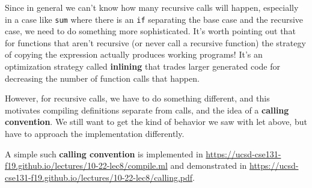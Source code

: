 \documentclass[10pt, oneside]{article}
\begin{document}
Since in general we can't know how many recursive calls will happen,
especially in a case like {\tt sum} where there is an {\tt if} separating the
base case and the recursive case, we need to do something more sophisticated.
It's worth pointing out that for functions that aren't recursive (or never
call a recursive function) the strategy of copying the expression actually
produces working programs! It's an optimization strategy called {\bf
inlining} that trades larger generated code for decreasing the number of
function calls that happen.

However, for recursive calls, we have to do something different, and this
motivates compiling definitions separate from calls, and the idea of a {\bf
calling convention}. We still want to get the kind of behavior we saw with
let above, but have to approach the implementation differently.

A simple such {\bf calling convention} is implemented in
\url{https://ucsd-cse131-f19.github.io/lectures/10-22-lec8/compile.ml} and
demonstrated in
\url{https://ucsd-cse131-f19.github.io/lectures/10-22-lec8/calling.pdf}.
\end{document}
